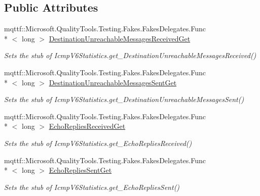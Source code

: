 \subsection*{Public Attributes}
\begin{DoxyCompactItemize}
\item 
mqttf\-::\-Microsoft.\-Quality\-Tools.\-Testing.\-Fakes.\-Fakes\-Delegates.\-Func\\*
$<$ long $>$ \hyperlink{class_system_1_1_net_1_1_network_information_1_1_fakes_1_1_stub_icmp_v6_statistics_aada184284aa580cd7ec3f12af4e5ebef}{Destination\-Unreachable\-Messages\-Received\-Get}
\begin{DoxyCompactList}\small\item\em Sets the stub of Icmp\-V6\-Statistics.\-get\-\_\-\-Destination\-Unreachable\-Messages\-Received()\end{DoxyCompactList}\item 
mqttf\-::\-Microsoft.\-Quality\-Tools.\-Testing.\-Fakes.\-Fakes\-Delegates.\-Func\\*
$<$ long $>$ \hyperlink{class_system_1_1_net_1_1_network_information_1_1_fakes_1_1_stub_icmp_v6_statistics_a0ed52205e261b32dff70e409b2639d8d}{Destination\-Unreachable\-Messages\-Sent\-Get}
\begin{DoxyCompactList}\small\item\em Sets the stub of Icmp\-V6\-Statistics.\-get\-\_\-\-Destination\-Unreachable\-Messages\-Sent()\end{DoxyCompactList}\item 
mqttf\-::\-Microsoft.\-Quality\-Tools.\-Testing.\-Fakes.\-Fakes\-Delegates.\-Func\\*
$<$ long $>$ \hyperlink{class_system_1_1_net_1_1_network_information_1_1_fakes_1_1_stub_icmp_v6_statistics_a7ccec7bb9a7ec9d985751b2a42db2829}{Echo\-Replies\-Received\-Get}
\begin{DoxyCompactList}\small\item\em Sets the stub of Icmp\-V6\-Statistics.\-get\-\_\-\-Echo\-Replies\-Received()\end{DoxyCompactList}\item 
mqttf\-::\-Microsoft.\-Quality\-Tools.\-Testing.\-Fakes.\-Fakes\-Delegates.\-Func\\*
$<$ long $>$ \hyperlink{class_system_1_1_net_1_1_network_information_1_1_fakes_1_1_stub_icmp_v6_statistics_a5dc21643fcd3eaea7e1bbe4c50c5fd01}{Echo\-Replies\-Sent\-Get}
\begin{DoxyCompactList}\small\item\em Sets the stub of Icmp\-V6\-Statistics.\-get\-\_\-\-Echo\-Replies\-Sent()\end{DoxyCompactList}\item 

\end{DoxyCompactItemize}
